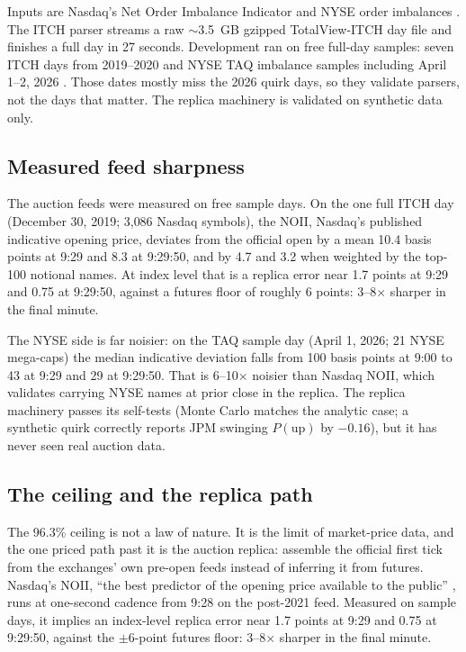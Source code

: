 Inputs are Nasdaq's Net Order Imbalance Indicator and NYSE order
imbalances \citep{nasdaq2026totalview,nyse2026taqimbalances}. The ITCH
parser streams a raw $\sim$3.5~GB gzipped TotalView-ITCH day file and
finishes a full day in 27 seconds. Development ran on free full-day
samples: seven ITCH days from 2019--2020 \citep{nasdaq2026itchsamples}
and NYSE TAQ imbalance samples including April 1--2, 2026
\citep{nyse2026taqimbalances}. Those dates mostly miss the 2026 quirk
days, so they validate parsers, not the days that matter. The replica
machinery is validated on synthetic data only.

\subsection{Measured feed sharpness}
\label{app:replica_sharpness}

The auction feeds were measured on free sample days. On the one full ITCH
day (December 30, 2019; 3{,}086 Nasdaq symbols), the NOII, Nasdaq's
published indicative opening price, deviates from the official open by a
mean 10.4 basis points at 9:29 and 8.3 at 9:29:50, and by 4.7 and 3.2 when
weighted by the top-100 notional names. At index level that is a replica
error near 1.7 points at 9:29 and 0.75 at 9:29:50, against a futures floor
of roughly 6 points: 3--8$\times$ sharper in the final minute.

The NYSE side
is far noisier: on the TAQ sample day (April 1, 2026; 21 NYSE mega-caps) the
median indicative deviation falls from 100 basis points at 9:00 to 43 at
9:29 and 29 at 9:29:50. That is 6--10$\times$ noisier than Nasdaq NOII,
which validates carrying NYSE names at prior close in the replica. The replica
machinery passes its self-tests (Monte Carlo matches the analytic case; a
synthetic quirk correctly reports JPM swinging $P(\text{up})$ by $-0.16$),
but it has never seen real auction data.

\subsection{The ceiling and the replica path}
\label{app:replica_path}

The 96.3\% ceiling is not a law of nature. It is the limit of
market-price data, and the one priced path past it is the auction
replica: assemble the official first tick from the exchanges' own
pre-open feeds instead of inferring it from futures. Nasdaq's NOII,
``the best predictor of the opening price available to the public''
\citep{nasdaq2026totalview}, runs at one-second cadence from 9:28 on
the post-2021 feed. Measured on sample days, it implies an index-level
replica error near 1.7 points at 9:29 and 0.75 at 9:29:50, against the
$\pm 6$-point futures floor: 3--8$\times$ sharper in the final minute.

